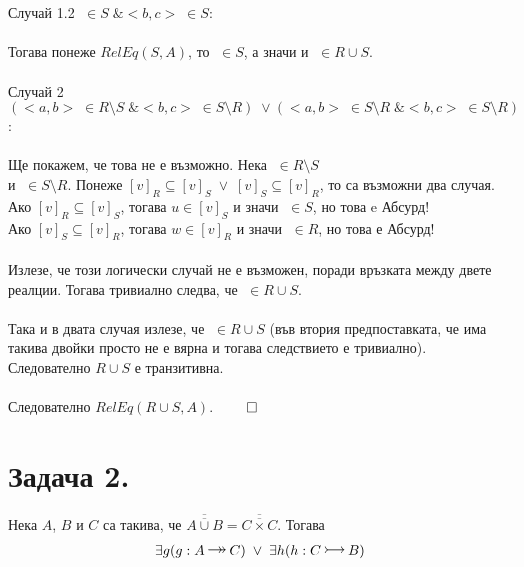 \documentclass[12pt]{article}
\newcommand{\injection}[0]{\,\mathlarger{\mathlarger{\rightarrowtail}}\,}
\newcommand{\surjection}[0]{\,\mathlarger{\mathlarger{\twoheadrightarrow}}\,}
\begin{document}
\\
\vspace{1mm}
\\
Случай 1.2 \(<a, b> \; \in S \; \& <b, c> \; \in S\):
\\
\vspace{1mm}
\\
Тогава понеже \(RelEq(S, A)\), то \(<a, c> \; \in S\), а значи и \(<a, c> \; \in R \cup S\).
\\
\vspace{1mm}
\\
Случай 2 \((<a, b> \; \in R \setminus S \; \& <b, c> \; \in S \setminus R) \; \lor (<a, b> \; \in S \setminus R \; \& <b, c> \; \in S \setminus R)\):
\\
\vspace{1mm}
\\
Ще покажем, че това не е възможно.
Нека \(<u, v> \; \in R \setminus S\)
\\
и \(<v, w> \; \in S \setminus R\).
Понеже \([v]_R \subseteq [v]_S \; \lor \; [v]_S \subseteq [v]_R\), то са възможни два случая.
\\
Ако \([v]_R \subseteq [v]_S\), тогава \(u \in [v]_S\) и значи \(<u, v> \; \in S\), но това e Абсурд!
\\
Ако \([v]_S \subseteq [v]_R\), тогава \(w \in [v]_R\) и значи \(<v, w> \; \in R\), но това е Абсурд!
\\
\vspace{1mm}
\\
Излезе, че този логически случай не е възможен, поради връзката между двете реалции.
Тогава тривиално следва, че \(<a, c> \; \in R \cup S\).
\\
\vspace{1mm}
\\
Така и в двата случая излезе, че \(<a, c> \; \in R \cup S\) (във втория предпоставката, че има такива двойки просто не е вярна и тогава следствието е тривиално).
Следователно \(R \cup S\) е транзитивна.
\\
\vspace{1mm}
\\
Следователно \(RelEq(R \cup S, A)\). \(\qed\)

\section*{Задача 2.}
Нека \(A\), \(B\) и \(C\) са такива, че
\(\overline{\overline{A \cup B}} = \overline{\overline{C \times C}}\).
Тогава
\begin{align*}
    \exists g (g : A \surjection C) \; \lor \; \exists h (h : C \injection B)
\end{align*}
\end{document}
